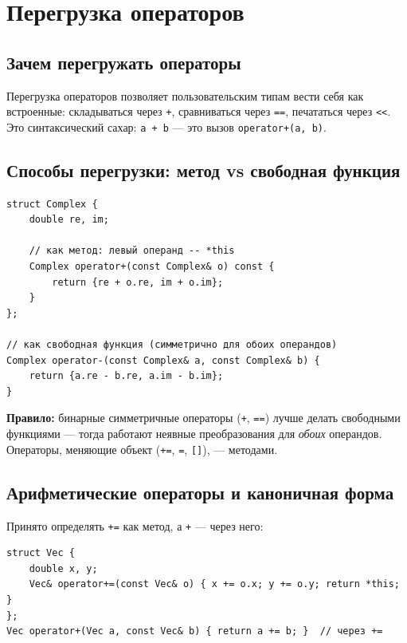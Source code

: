 \section{Перегрузка операторов}

\subsection{Зачем перегружать операторы}

Перегрузка операторов позволяет пользовательским типам вести себя как
встроенные: складываться через \texttt{+}, сравниваться через \texttt{==},
печататься через \texttt{<<}. Это синтаксический сахар: \texttt{a + b} ---
это вызов \texttt{operator+(a, b)}.

\subsection{Способы перегрузки: метод vs свободная функция}

\begin{lstlisting}
struct Complex {
    double re, im;

    // как метод: левый операнд -- *this
    Complex operator+(const Complex& o) const {
        return {re + o.re, im + o.im};
    }
};

// как свободная функция (симметрично для обоих операндов)
Complex operator-(const Complex& a, const Complex& b) {
    return {a.re - b.re, a.im - b.im};
}
\end{lstlisting}

\textbf{Правило:} бинарные симметричные операторы (\texttt{+}, \texttt{==}) лучше
делать свободными функциями --- тогда работают неявные преобразования для
\textit{обоих} операндов. Операторы, меняющие объект (\texttt{+=}, \texttt{=},
\texttt{[]}), --- методами.

\subsection{Арифметические операторы и каноничная форма}

Принято определять \texttt{+=} как метод, а \texttt{+} --- через него:

\begin{lstlisting}
struct Vec {
    double x, y;
    Vec& operator+=(const Vec& o) { x += o.x; y += o.y; return *this; }
};
Vec operator+(Vec a, const Vec& b) { return a += b; }  // через +=
\end{lstlisting}

